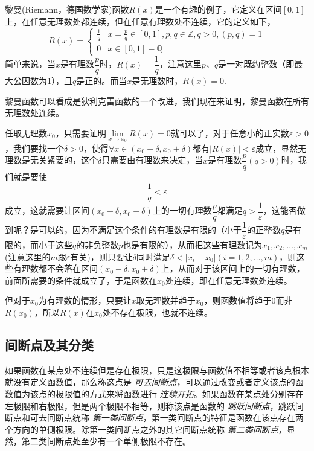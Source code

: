 \begin{example}
  黎曼(Riemann，德国数学家)函数$R(x)$是一个有趣的例子，它定义在区间$[0,1]$上，在任意无理数处都连续，但在任意有理数处不连续，它的定义如下，
  \[ R(x) =
    \begin{cases}
      \frac{1}{q} & x=\frac{p}{q} \in [0,1], p,q \in \mathbb{Z}, q >0, (p,q)=1 \\
      0 & x \in [0,1]-\mathbb{Q}
    \end{cases}
  \]
  简单来说，当$x$是有理数$\dfrac{p}{q}$时，$R(x)=\dfrac{1}{q}$，注意这里$p$、$q$是一对既约整数（即最大公因数为1），且$q$是正的。而当$x$是无理数时，$R(x)=0$.

  黎曼函数可以看成是狄利克雷函数的一个改进，我们现在来证明，黎曼函数在所有无理数处连续。

  任取无理数$x_0$，只需要证明$\lim\limits_{x \to x_0} R(x)=0$就可以了，对于任意小的正实数$\varepsilon>0$，我们要找一个$\delta>0$，使得$\forall x \in (x_0-\delta,x_0+\delta)$都有$|R(x)|<\varepsilon$成立，显然无理数是无关紧要的，这个$\delta$只需要由有理数来决定，当$x$是有理数$\dfrac{p}{q}(q>0)$时，我们就是要使
  \[ \frac{1}{q} < \varepsilon \]
  成立，这就需要让区间$(x_0-\delta,x_0+\delta)$上的一切有理数$\dfrac{p}{q}$都满足$q > \dfrac{1}{\varepsilon}$，这能否做到呢？是可以的，因为不满足这个条件的有理数是有限的（小于$\dfrac{1}{\varepsilon}$的正整数$q$是有限的，而小于这些$q$的非负整数$p$也是有限的），从而把这些有理数记为$x_1,x_2,\ldots,x_m$(注意这里的$m$跟$\varepsilon$有关)，则只要让$\delta$同时满足$\delta < |x_i-x_0|(i=1,2,\ldots,m)$，则这些有理数都不会落在区间$(x_0-\delta,x_0+\delta)$上，从而对于该区间上的一切有理数，前面所需要的条件就成立了，于是函数在$x_0$处连续，即在任意无理数处连续。

  但对于$x_0$为有理数的情形，只要让$x$取无理数并趋于$x_0$，则函数值将趋于0而非$R(x_0)$，所以$R(x)$在$x_0$处不存在极限，也就不连续。
\end{example}

\subsection{间断点及其分类}
\label{sec:discontinuity-point-and-its-category}

如果函数在某点处不连续但是存在极限，只是这极限与函数值不相等或者该点根本就没有定义函数值，那么称这点是 \emph{可去间断点}，可以通过改变或者定义该点的函数值为该点的极限值的方式来将函数进行 \emph{连续开拓}。如果函数在某点处分别存在左极限和右极限，但是两个极限不相等，则称该点是函数的 \emph{跳跃间断点}，跳跃间断点和可去间断点统称 \emph{第一类间断点}，第一类间断点的特征是函数在该点存在两个方向的单侧极限。除第一类间断点之外的其它间断点统称 \emph{第二类间断点}，显然，第二类间断点处至少有一个单侧极限不存在。

